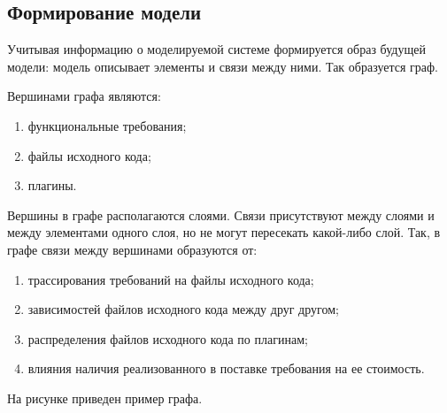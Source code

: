 



\subsection*{Формирование модели}
Учитывая информацию о моделируемой системе формируется образ будущей модели: модель описывает элементы и связи между ними. Так образуется граф.

Вершинами графа являются:
\begin{enumerate}
    \item функциональные требования;
    \item файлы исходного кода;
    \item плагины.
\end{enumerate}

Вершины в графе располагаются слоями. Связи присутствуют между слоями и между элементами одного слоя, но не могут пересекать какой-либо слой. Так, в графе связи между вершинами образуются от:
\begin{enumerate}
    \item трассирования требований на файлы исходного кода;
    \item зависимостей файлов исходного кода между друг другом;
    \item распределения файлов исходного кода по плагинам;
    \item влияния наличия реализованного в поставке требования на ее стоимость.
\end{enumerate}

На рисунке приведен пример графа.

